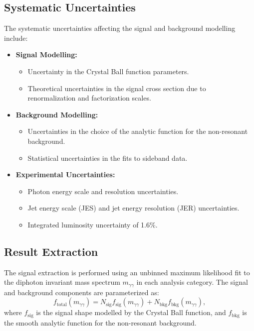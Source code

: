 \subsection{Systematic Uncertainties}
The systematic uncertainties affecting the signal and background modelling include:
\begin{itemize}
    \item \textbf{Signal Modelling:}
    \begin{itemize}
        \item Uncertainty in the Crystal Ball function parameters.
        \item Theoretical uncertainties in the signal cross section due to renormalization and factorization scales.
    \end{itemize}
    \item \textbf{Background Modelling:}
    \begin{itemize}
        \item Uncertainties in the choice of the analytic function for the non-resonant background.
        \item Statistical uncertainties in the fits to sideband data.
    \end{itemize}
    \item \textbf{Experimental Uncertainties:}
    \begin{itemize}
        \item Photon energy scale and resolution uncertainties.
        \item Jet energy scale (JES) and jet energy resolution (JER) uncertainties.
        \item Integrated luminosity uncertainty of 1.6\%.
    \end{itemize}
\end{itemize}

\subsection{Result Extraction}
The signal extraction is performed using an unbinned maximum likelihood fit to the diphoton invariant mass spectrum \(m_{\gamma\gamma}\) in each analysis category. The signal and background components are parameterized as:
\[
f_{\text{total}}(m_{\gamma\gamma}) = N_{\text{sig}} f_{\text{sig}}(m_{\gamma\gamma}) + N_{\text{bkg}} f_{\text{bkg}}(m_{\gamma\gamma}),
\]
where \(f_{\text{sig}}\) is the signal shape modelled by the Crystal Ball function, and \(f_{\text{bkg}}\) is the smooth analytic function for the non-resonant background.

